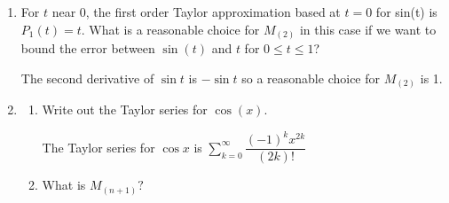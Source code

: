 \documentclass[main]{subfiles}
\begin{document}
\begin{enumerate}
\begin{enumerate}
\begin{solution}
    The second derivative is $f''(x)=\dfrac{-1}{4x^{\frac{3}{2}}}$ which is largest at $x=100$, which makes $\frac{1}{4000}$ a reasonable choice for $M_{(2)}$. Plugging this into our error formula, $\text{error}\leq \dfrac{2^2}{2\cdot 4000}=\dfrac{1}{2000}$.
\end{solution}
\item\begin{problem}[\vfill]
    Find a viable choice for $M_{(2)}$ in the case $x = 99$. Then use this value of $M_{(2)}$ and also $x = 99$ in the error bound formula.
\end{problem} 
\begin{solution}
    The second derivative is $f''(x)=\dfrac{-1}{4x^{\frac{3}{2}}}$ which is largest at $x=99$. However, we don't know $\sqrt{99}$ (this is what we are approximating), so we can choose something nearby, like $81$ which makes $\frac{1}{4\cdot 729}$ a reasonable choice for $M_{(2)}$. To simplify computations further, we could say this is less than $\frac{1}{2500}$. Using this value for $M_{(2)}$, we see our error$\leq \dfrac{1}{2\cdot2500}=\dfrac{1}{5000}$.
\end{solution}
\end{enumerate}

\pspace{\newpage}

\item\begin{problem}[\vfill]
For $t$ near 0, the first order Taylor approximation based at $t = 0$ for sin(t) is $P_1(t) = t$. What is a
reasonable choice for $M_{(2)}$ in this case if we want to bound the error between $\sin(t)$ and $t$ for $0\leq t \leq 1$?    
\end{problem} 
\begin{solution}
    The second derivative of $\sin t$ is $-\sin t$ so a reasonable choice for $M_{(2)}$ is 1.
\end{solution}

\item \begin{enumerate}
\item \begin{problem}[1in]
    Write out the Taylor series for $\cos(x)$.
\end{problem}

\begin{solution}
    The Taylor series for $\cos x$ is $\displaystyle\sum_{k=0}^\infty \dfrac{(-1)^kx^{2k}}{(2k)!}$
\end{solution}
\item \begin{problem}[\vfill]
    What is $M_{(n+1)}?$
\end{problem}


\end{enumerate}
\end{enumerate}
\end{document}
